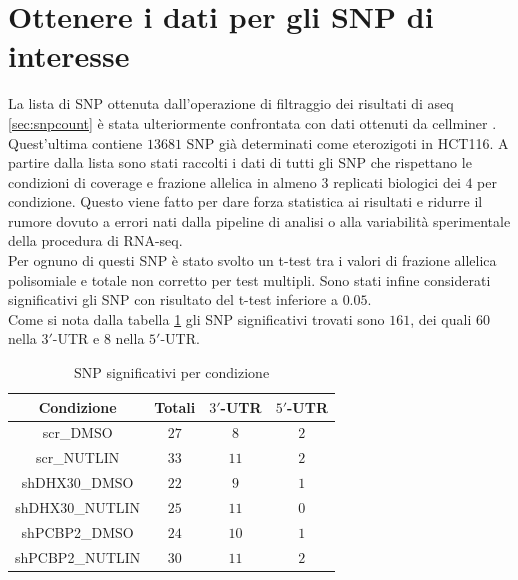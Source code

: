 \section{Ottenere i dati per gli SNP di interesse}
\label{sec:snp_filter}
La lista di SNP ottenuta dall'operazione di filtraggio dei risultati di aseq \ref{sec:snpcount} \`e stata ulteriormente confrontata con dati ottenuti da cellminer \cite{cellminer}.
Quest'ultima contiene $13681$ SNP gi\`a determinati come eterozigoti in HCT116.
A partire dalla lista sono stati raccolti i dati di tutti gli SNP che rispettano le condizioni di coverage e frazione allelica in almeno $3$ replicati biologici dei $4$ per condizione.
Questo viene fatto per dare forza statistica ai risultati e ridurre il rumore dovuto a errori nati dalla pipeline di analisi o alla variabilit\`a sperimentale della procedura di RNA-seq.\\
Per ognuno di questi SNP \`e stato svolto un t-test \cite{ttest} tra i valori di frazione allelica polisomiale e totale non corretto per test multipli.
Sono stati infine considerati significativi gli SNP con risultato del t-test inferiore a $0.05$.\\
Come si nota dalla tabella \ref{tab:significativesnp} gli SNP significativi trovati sono $161$, dei quali $60$ nella $3'$-UTR e $8$ nella $5'$-UTR.
\begin{table}[H]
	\begin{tabular}{|c|c|c|c|}
		\hline
		Condizione & Totali & $3'$-UTR & $5'$-UTR\\
		\hline
		scr\_DMSO & $27$ & $8$ & $2$\\
		\hline
		scr\_NUTLIN & $33$ & $11$ & $2$\\
		\hline
		shDHX30\_DMSO & $22$ & $9$ & $1$\\
		\hline
		shDHX30\_NUTLIN & $25$ & $11$ & $0$\\
		\hline
		shPCBP2\_DMSO & $24$ & $10$ & $1$\\
		\hline
		shPCBP2\_NUTLIN & $30$ & $11$ & $2$\\
		\hline
	\end{tabular}
	\centering
	\caption{SNP significativi per condizione}
	\label{tab:significativesnp}
\end{table}

